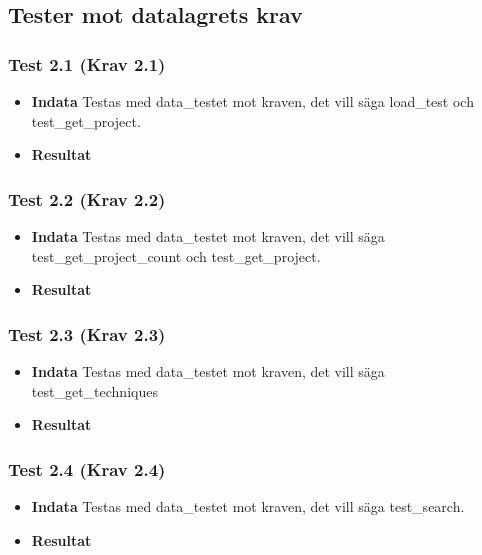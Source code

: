 \documentclass{TDP003mall}
\begin{document}
\subsection{Tester mot datalagrets krav}
\subsubsection*{Test 2.1 (Krav 2.1)}
\begin{itemize}
\item[]\textbf{Indata} Testas med data\_testet mot kraven, det vill säga load\_test och test\_get\_project.
\item[]\textbf{Resultat} 
\end{itemize}
\subsubsection*{Test 2.2 (Krav 2.2)}
\begin{itemize}
\item[]\textbf{Indata} Testas med data\_testet mot kraven, det vill säga test\_get\_project\_count och test\_get\_project.
\item[]\textbf{Resultat} 
\end{itemize}
\subsubsection*{Test 2.3 (Krav 2.3)}
\begin{itemize}
\item[]\textbf{Indata} Testas med data\_testet mot kraven, det vill säga test\_get\_techniques
\item[]\textbf{Resultat} 
\end{itemize}
\subsubsection*{Test 2.4 (Krav 2.4)}
\begin{itemize}
\item[]\textbf{Indata} Testas med data\_testet mot kraven, det vill säga test\_search.
\item[]\textbf{Resultat} 
\end{itemize}
\end{document}
